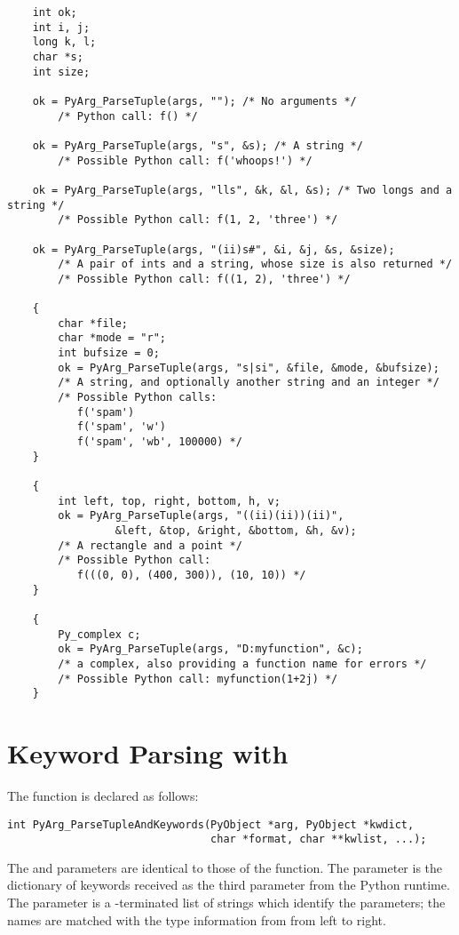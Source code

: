 \documentclass{manual}
\begin{document}
\begin{verbatim}
    int ok;
    int i, j;
    long k, l;
    char *s;
    int size;

    ok = PyArg_ParseTuple(args, ""); /* No arguments */
        /* Python call: f() */

    ok = PyArg_ParseTuple(args, "s", &s); /* A string */
        /* Possible Python call: f('whoops!') */

    ok = PyArg_ParseTuple(args, "lls", &k, &l, &s); /* Two longs and a string */
        /* Possible Python call: f(1, 2, 'three') */

    ok = PyArg_ParseTuple(args, "(ii)s#", &i, &j, &s, &size);
        /* A pair of ints and a string, whose size is also returned */
        /* Possible Python call: f((1, 2), 'three') */

    {
        char *file;
        char *mode = "r";
        int bufsize = 0;
        ok = PyArg_ParseTuple(args, "s|si", &file, &mode, &bufsize);
        /* A string, and optionally another string and an integer */
        /* Possible Python calls:
           f('spam')
           f('spam', 'w')
           f('spam', 'wb', 100000) */
    }

    {
        int left, top, right, bottom, h, v;
        ok = PyArg_ParseTuple(args, "((ii)(ii))(ii)",
                 &left, &top, &right, &bottom, &h, &v);
        /* A rectangle and a point */
        /* Possible Python call:
           f(((0, 0), (400, 300)), (10, 10)) */
    }

    {
        Py_complex c;
        ok = PyArg_ParseTuple(args, "D:myfunction", &c);
        /* a complex, also providing a function name for errors */
        /* Possible Python call: myfunction(1+2j) */
    }
\end{verbatim}


\section{Keyword Parsing with }
\label{parseTupleAndKeywords}

The  function is declared as
follows:

\begin{verbatim}
int PyArg_ParseTupleAndKeywords(PyObject *arg, PyObject *kwdict,
                                char *format, char **kwlist, ...);
\end{verbatim}

The  and  parameters are identical to those of the
 function.  The  parameter
is the dictionary of keywords received as the third parameter from the 
Python runtime.  The  parameter is a \NULL{}-terminated
list of strings which identify the parameters; the names are matched
with the type information from  from left to right.
\end{document}
